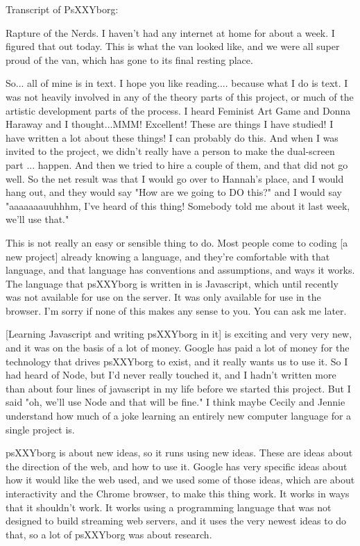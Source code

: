 Transcript of PsXXYborg:

Rapture of the Nerds. 
I haven't had any internet at home for about a week. I figured that out today. This is what the van looked like, and we were all super proud of the van, which has gone to its final resting place. 

So... all of mine is in text. I hope you like reading.... because what I do is text. I was not heavily involved in any of the theory parts of this project, or much of the artistic development parts of the process. I heard Feminist Art Game and Donna Haraway and I thought...MMM! Excellent! These are things I have studied! I have written a lot about these things! I can probably do this. And when I was invited to the project, we didn't really have a person to make the dual-screen part ... happen. And then we tried to hire a couple of them, and that did not go well. So the net result was that I would go over to Hannah's place, and I would hang out, and they would say "How are we going to DO this?" and I would say "aaaaaaauuhhhm, I've heard of this thing! Somebody told me about it last week, we'll use that." 

This is not really an easy or sensible thing to do. Most people come to coding [a new project] already knowing a language, and they're comfortable with that language, and that language has conventions and assumptions, and ways it works. The language that psXXYborg is written in is Javascript, which until recently was not available for use on the server. It was only available for use in the browser. I'm sorry if none of this makes any sense to you. You can ask me later. 

[Learning Javascript and writing psXXYborg in it] is exciting and very very new, and it was on the basis of a lot of money. Google has paid a lot of money for the technology that drives psXXYborg to exist, and it really wants us to use it. So I had heard of Node, but I'd never really touched it, and I hadn't written more than about four lines of javascript in my life before we started this project. But I said "oh, we'll use Node and that will be fine." I think maybe Cecily and Jennie understand how much of a joke learning an entirely new computer language for a single project is. 

psXXYborg is about new ideas, so it runs using new ideas. These are ideas about the direction of the web, and how to use it. Google has very specific ideas about how it would like the web used, and we used some of those ideas, which are about interactivity and the Chrome browser, to make this thing work. It works in ways that it shouldn't work. It works using a programming language that was not designed to build streaming web servers, and it uses the very newest ideas to do that, so a lot of psXXYborg was about research.

